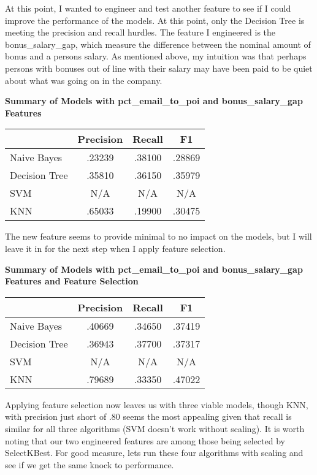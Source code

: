 \documentclass[a4paper,11pt]{report}
\begin{document}
At this point, I wanted to engineer and test another feature to see if I could
improve the performance of the models.  At this point, only the Decision Tree is
meeting the precision and recall hurdles.  The feature I engineered is the
bonus\_salary\_gap, which measure the difference between the nominal amount of
bonus and a persons salary.  As mentioned above, my intuition was that perhaps
persons with bonuses out of line with their salary may have been paid to be
quiet about what was going on in the company.

\textbf{Summary of Models with pct\_email\_to\_poi and bonus\_salary\_gap Features}
\begin{center}
    \begin{tabular}{|| l c c c ||}
        \hline & Precision & Recall & F1 \\
        \hline\hline
        Naive Bayes & .23239 & .38100 & .28869 \\
        \hline
        Decision Tree & .35810 & .36150 & .35979 \\
        \hline
        SVM & N/A & N/A & N/A \\
        \hline
        KNN & .65033 & .19900 & .30475  \\
        \hline
    \end{tabular}
\end{center}

The new feature seems to provide minimal to no impact on the models, but I will
leave it in for the next step when I apply feature selection.

\textbf{Summary of Models with pct\_email\_to\_poi and bonus\_salary\_gap Features
and Feature Selection}
\begin{center}
    \begin{tabular}{|| l c c c ||}
        \hline & Precision & Recall & F1 \\
        \hline\hline
        Naive Bayes & .40669 & .34650 & .37419 \\
        \hline
        Decision Tree & .36943 & .37700 & .37317 \\
        \hline
        SVM & N/A & N/A & N/A \\
        \hline
        KNN & .79689 & .33350 & .47022  \\
        \hline
    \end{tabular}
\end{center}

Applying feature selection now leaves us with three viable models, though KNN,
with precision just short of .80 seems the most appealing given that recall is
similar for all three algorithms (SVM doesn't work without scaling).  It is
worth noting that our two engineered features are among those being selected by
SelectKBest.  For good measure, lets run these four algorithms with scaling and
see if we get the same knock to performance.
\end{document}
